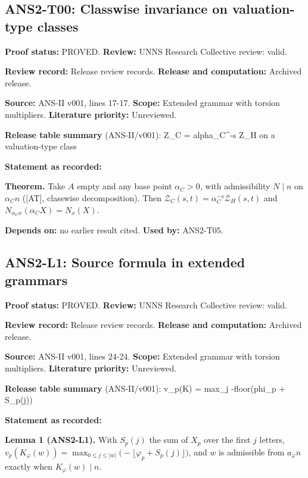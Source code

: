 \documentclass[
  11pt,
]{article}
\begin{document}
\hypertarget{ans2-t00-classwise-invariance-on-valuation-type-classes}{%
\subsection{ANS2-T00: Classwise invariance on valuation-type
classes}\label{ans2-t00-classwise-invariance-on-valuation-type-classes}}

\textbf{Proof status:} PROVED. \textbf{Review:} UNNS Research Collective
review: valid.

\textbf{Review record:} Release review records. \textbf{Release and
computation:} Archived release.

\textbf{Source:} ANS-II v001, lines 17-17. \textbf{Scope:} Extended
grammar with torsion multipliers. \textbf{Literature priority:}
Unreviewed.

\textbf{Release table summary} (ANS-II/v001): Z\_C = alpha\_C\^{}-s Z\_H
on a valuation-type class

\textbf{Statement as recorded:}

\textbf{Theorem.} Take \(A\) empty and any base point \(\alpha_C>0\),
with admissibility \(N\mid n\) on \(\alpha_Cn\) ({[}AT{]}, classwise
decomposition). Then
\(\mathcal Z_C(s,t)=\alpha_C^{-s}\mathcal Z_H(s,t)\) and
\(N_{\alpha_Cx}(\alpha_CX)=N_x(X)\).

\textbf{Depends on:} no earlier result cited. \textbf{Used by:}
ANS2-T05.

\hypertarget{ans2-l1-source-formula-in-extended-grammars}{%
\subsection{ANS2-L1: Source formula in extended
grammars}\label{ans2-l1-source-formula-in-extended-grammars}}

\textbf{Proof status:} PROVED. \textbf{Review:} UNNS Research Collective
review: valid.

\textbf{Review record:} Release review records. \textbf{Release and
computation:} Archived release.

\textbf{Source:} ANS-II v001, lines 24-24. \textbf{Scope:} Extended
grammar with torsion multipliers. \textbf{Literature priority:}
Unreviewed.

\textbf{Release table summary} (ANS-II/v001): v\_p(K) = max\_j
-floor(phi\_p + S\_p(j))

\textbf{Statement as recorded:}

\textbf{Lemma 1 (ANS2-L1).} With \(S_p(j)\) the sum of \(X_p\) over the
first \(j\) letters,
\(v_p(K_\varphi(w))=\max_{0\le j\le|w|}\big(-\lfloor\varphi_p+S_p(j)\rfloor\big)\),
and \(w\) is admissible from \(a_\varphi n\) exactly when
\(K_\varphi(w)\mid n\).
\end{document}
